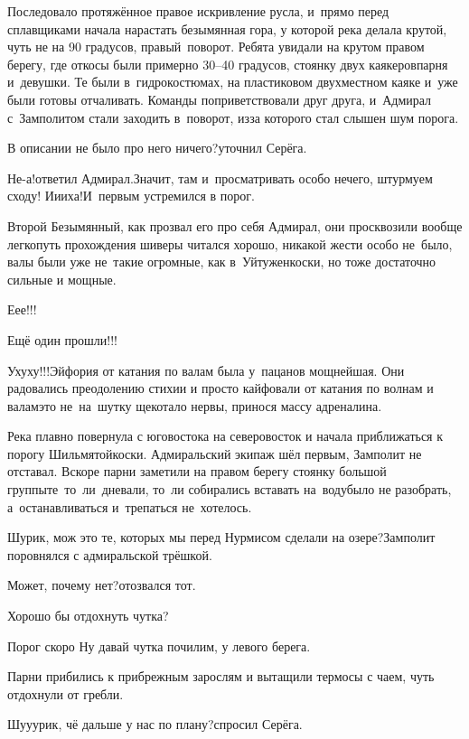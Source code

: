 Последовало протяжённое правое искривление русла, и~прямо перед сплавщиками начала нарастать безымянная гора, у которой река делала крутой, чуть не на 90 градусов, правый~поворот. Ребята увидали на крутом правом берегу, где откосы были примерно 30\nobreakdash--40 градусов, стоянку двух каякеров\mdash парня и~девушки. Те были в~гидрокостюмах, на пластиковом двухместном каяке и~уже были готовы отчаливать. Команды поприветствовали друг друга, и~Адмирал с~Замполитом стали заходить в~поворот, из\sdash за которого стал слышен шум порога.

\diagdash В описании не было про него ничего?\mdash уточнил Серёга.

\diagdash Не-а!\mdash ответил Адмирал.\mdash Значит, там и~просматривать особо нечего, штурмуем сходу! И\sdash и\sdash и\sdash ха!\mdash И~первым устремился в порог.

Второй Безымянный, как прозвал его про себя Адмирал, они просквозили вообще легко\mdash путь прохождения шиверы читался хорошо, никакой жести особо не~было, валы были уже не~такие огромные, как в~Уйтуженкоски, но тоже достаточно сильные и мощные.

\diagdash Е\sdash е\sdash е!!!

\diagdash Ещё один прошли!!!

\diagdash У\sdash ху\sdash ху!!!\mdash Эйфория от катания по валам была у~пацанов мощнейшая. Они радовались преодолению стихии и просто кайфовали от катания по волнам и валам\mdash это не~на~шутку щекотало нервы, принося массу адреналина.

Река плавно повернула с юго\sdash востока на северо\sdash восток и начала приближаться к порогу Шильмятойкоски. Адмиральский экипаж шёл первым, Замполит не отставал. Вскоре парни заметили на правом берегу стоянку большой группы\mdash те~то~ли~дневали, то~ли собирались вставать на~воду\mdash было не разобрать, а~останавливаться и~трепаться не~хотелось.

\diagdash Шурик, мож это те, которых мы перед Нурмисом сделали на озере?\mdash Замполит поровнялся с адмиральской трёшкой.

\diagdash Может, почему нет?\mdash отозвался тот.

\diagdash Хорошо бы отдохнуть чутка?

\diagdash Порог скоро\myldots{} Ну давай чутка почилим, у левого берега.

Парни прибились к прибрежным зарослям и вытащили термосы с чаем, чуть отдохнули от гребли.

\diagdash Шу\sdash у\sdash урик, чё дальше у нас по плану?\mdash спросил Серёга.

